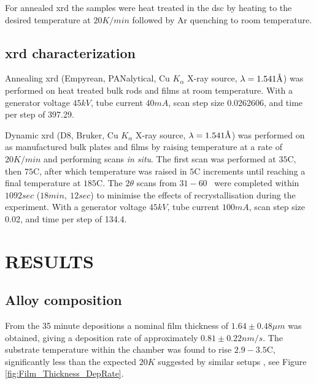 \documentclass[draft,a4paper,12pt,oneside]{article}%
\begin{document}
For annealed \acrshort{xrd} the samples were heat treated in the \acrshort{dsc} by heating to the desired temperature at $20 K/min$ followed by Ar quenching to room temperature.

\subsection{\acrshort{xrd} characterization}
Annealing \acrshort{xrd} (Empyrean, PANalytical, Cu $K_{\alpha}$ X-ray source, $\lambda = 1.541 \mbox{\normalfont\AA}$) was performed on heat treated bulk rods and films at room temperature. 
With a generator voltage $45 kV$, tube current $40 mA$, scan step size 0.0262606, and time per step of 397.29. 

Dynamic \acrshort{xrd} (D8, Bruker, Cu $K_{\alpha}$ X-ray source, $\lambda = 1.541 \mbox{\normalfont\AA}$) was performed on as manufactured bulk plates and films by raising temperature at a rate of $20 K/min$ and performing scans \textit{in situ}. The first scan was performed at $35$\degree C, then $75$\degree C, after which temperature was raised in $5$\degree C increments until reaching a final temperature at $185$\degree C. The $2 \theta$ scans from $31 - 60$\degree~ were completed within $1092 sec$ ($18min,~ 12sec$) to minimise the effects of recrystallisation during the experiment.
With a generator voltage $45 kV$, tube current $100 mA$, scan step size 0.02, and time per step of 134.4. 


\section{RESULTS}
\subsection{Alloy composition}

From the 35 minute depositions a nominal film thickness of $1.64 \pm 0.48 \mu m$ was obtained, giving a deposition rate of approximately $0.81 \pm 0.22 nm/s$. The substrate temperature within the chamber was found to rise $2.9 - 3.5$\degree C, significantly less than the expected $20K$ suggested by similar setups \cite{Wang2014}, see Figure \ref{fig:Film_Thickness_DepRate}.
\end{document}
